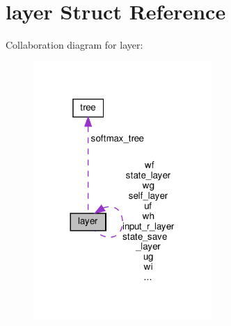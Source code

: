 \hypertarget{structlayer}{}\section{layer Struct Reference}
\label{structlayer}


Collaboration diagram for layer\+:\nopagebreak
\begin{figure}[H]
\begin{center}
\leavevmode
\includegraphics[width=192pt]{structlayer__coll__graph}
\end{center}
\end{figure}
